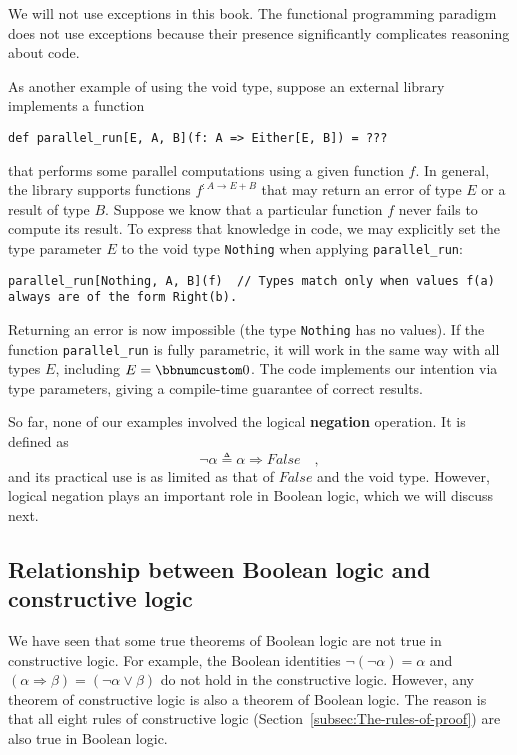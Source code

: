 We will not use exceptions in this book. The functional programming
paradigm does not use exceptions because their presence significantly
complicates reasoning about code.

As another example of using the void type, suppose an external library
implements a function
\begin{lstlisting}
def parallel_run[E, A, B](f: A => Either[E, B]) = ???
\end{lstlisting}
that performs some parallel computations using a given function $f$.
In general, the library supports functions $f^{:A\rightarrow E+B}$
that may return an error of type $E$ or a result of type $B$. Suppose
we know that a particular function $f$ never fails to compute its
result. To express that knowledge in code, we may explicitly set the
type parameter $E$ to the void type \lstinline!Nothing! when applying
\lstinline!parallel_run!:
\begin{lstlisting}
parallel_run[Nothing, A, B](f)  // Types match only when values f(a) always are of the form Right(b). 
\end{lstlisting}
Returning an error is now impossible (the type \lstinline!Nothing!
has no values). If the function \lstinline!parallel_run! is fully
parametric, it will work in the same way with all types $E$, including
$E=\bbnum 0$. The code implements our intention via type parameters,
giving a compile-time guarantee of correct results.

So far, none of our examples involved the logical \textbf{negation}
operation. It is defined as 
\[
\neg\alpha\triangleq\alpha\Rightarrow False\quad,
\]
and its practical use is as limited as that of $False$ and the void
type. However, logical negation plays an important role in Boolean
logic, which we will discuss next.

\subsection{Relationship between Boolean logic and constructive logic\label{subsec:Relationship-between-Boolean} }

We have seen that some true theorems of Boolean logic are not true
in constructive logic. For example, the Boolean identities $\neg\left(\neg\alpha\right)=\alpha$
and $\left(\alpha\Rightarrow\beta\right)=(\neg\alpha\vee\beta)$ do
not hold in the constructive logic. However, any theorem of constructive
logic is also a theorem of Boolean logic. The reason is that all eight
rules of constructive logic (Section~\ref{subsec:The-rules-of-proof})
are also true in Boolean logic.

